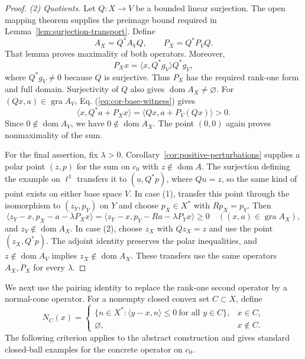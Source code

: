 \documentclass[11pt]{article}
\newcommand{\gra}{\operatorname{gra}}
\newcommand{\dom}{\operatorname{dom}}
\newcommand{\pair}[2]{\langle #1,#2\rangle}
\theoremstyle{definition}
\theoremstyle{remark}
\begin{document}
\begin{proof}
\noindent\textit{(2) Quotients.}
Let $Q:X\to V$ be a bounded linear surjection. The open mapping theorem supplies the preimage bound required in Lemma~\ref{lem:surjection-transport}. Define
\[
A_X=Q^*A_VQ,\qquad P_X=Q^*P_VQ.
\]
That lemma proves maximality of both operators. Moreover,
\[
P_Xx=\pair{x}{Q^*g_V}Q^*g_V,
\]
where $Q^*g_V\ne0$ because $Q$ is surjective. Thus $P_X$ has the required rank-one form and full domain. Surjectivity of $Q$ also gives $\dom A_X\ne\varnothing$. For $(Qx,a)\in\gra A_V$, Eq. (\ref{eq:cor-base-witness}) gives
\[
\pair{x}{Q^*a+P_Xx}
=\pair{Qx}{a+P_V(Qx)}>0.
\]
Since $0\notin\dom A_V$, we have $0\notin\dom A_X$. The point $(0,0)$ again proves nonmaximality of the sum.

For the final assertion, fix $\lambda>0$. Corollary~\ref{cor:positive-perturbations} supplies a polar point $(z,p)$ for the sum on $c_0$ with $z\notin\dom A$. The surjection defining the example on $\ell^1$ transfers it to $(u,Q^*p)$, where $Qu=z$, so the same kind of point exists on either base space $V$. In case (1), transfer this point through the isomorphism to $(z_Y,p_Y)$ on $Y$ and choose $p_X\in X^*$ with $Rp_X=p_Y$. Then
\[
\pair{z_Y-x}{p_X-a-\lambda P_Xx}
=\pair{z_Y-x}{p_Y-Ra-\lambda P_Yx}\ge0
\quad((x,a)\in\gra A_X),
\]
and $z_Y\notin\dom A_X$. In case (2), choose $z_X$ with $Qz_X=z$ and use the point $(z_X,Q^*p)$. The adjoint identity preserves the polar inequalities, and $z\notin\dom A_V$ implies $z_X\notin\dom A_X$. These transfers use the same operators $A_X,P_X$ for every $\lambda$.
\end{proof}

We next use the pairing identity to replace the rank-one second operator by a normal-cone operator. For a nonempty closed convex set $C\subset X$, define
\[
N_C(x)=
\begin{cases}
\{n\in X^*:\pair{y-x}{n}\le0\ \text{for all }y\in C\},&x\in C,\\
\varnothing,&x\notin C.
\end{cases}
\]
The following criterion applies to the abstract construction and gives standard closed-ball examples for the concrete operator on $c_0$.
\end{document}
